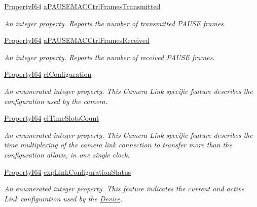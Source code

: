 \begin{DoxyCompactItemize}
\hyperlink{group___common_interface_ga81749b2696755513663492664a18a893}{Property\+I64} \hyperlink{classmv_i_m_p_a_c_t_1_1acquire_1_1_gen_i_cam_1_1_transport_layer_control_a9e35e41fce792a85513a01a72ba161e9}{a\+P\+A\+U\+S\+E\+M\+A\+C\+Ctrl\+Frames\+Transmitted}
\begin{DoxyCompactList}\small\item\em An integer property. Reports the number of transmitted P\+A\+U\+S\+E frames. \end{DoxyCompactList}\item 
\hyperlink{group___common_interface_ga81749b2696755513663492664a18a893}{Property\+I64} \hyperlink{classmv_i_m_p_a_c_t_1_1acquire_1_1_gen_i_cam_1_1_transport_layer_control_a3797091432d137e2394ccc71c7804fee}{a\+P\+A\+U\+S\+E\+M\+A\+C\+Ctrl\+Frames\+Received}
\begin{DoxyCompactList}\small\item\em An integer property. Reports the number of received P\+A\+U\+S\+E frames. \end{DoxyCompactList}\item 
\hyperlink{group___common_interface_ga81749b2696755513663492664a18a893}{Property\+I64} \hyperlink{classmv_i_m_p_a_c_t_1_1acquire_1_1_gen_i_cam_1_1_transport_layer_control_a75d07df2868813a424f936d18627ba58}{cl\+Configuration}
\begin{DoxyCompactList}\small\item\em An enumerated integer property. This Camera Link specific feature describes the configuration used by the camera. \end{DoxyCompactList}\item 
\hyperlink{group___common_interface_ga81749b2696755513663492664a18a893}{Property\+I64} \hyperlink{classmv_i_m_p_a_c_t_1_1acquire_1_1_gen_i_cam_1_1_transport_layer_control_a11a7642037b030f135e45e7488be1d95}{cl\+Time\+Slots\+Count}
\begin{DoxyCompactList}\small\item\em An enumerated integer property. This Camera Link specific feature describes the time multiplexing of the camera link connection to transfer more than the configuration allows, in one single clock. \end{DoxyCompactList}\item 
\hyperlink{group___common_interface_ga81749b2696755513663492664a18a893}{Property\+I64} \hyperlink{classmv_i_m_p_a_c_t_1_1acquire_1_1_gen_i_cam_1_1_transport_layer_control_a1d31bd57c58be9b4d17d8a57b166199d}{cxp\+Link\+Configuration\+Status}
\begin{DoxyCompactList}\small\item\em An enumerated integer property. This feature indicates the current and active Link configuration used by the \hyperlink{classmv_i_m_p_a_c_t_1_1acquire_1_1_device}{Device}. \end{DoxyCompactList}\item 

\end{DoxyCompactItemize}
